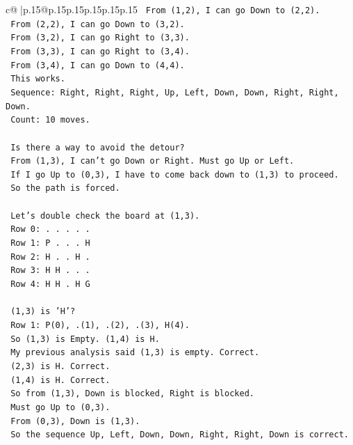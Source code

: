 \documentclass{article}
\begin{document}
{\begin{supertabular}{c@{$\;$}|p{.15\linewidth}@{}p{.15\linewidth}p{.15\linewidth}p{.15\linewidth}p{.15\linewidth}p{.15\linewidth}}
{{{\texttt{   From (1,2), I can go Down to (2,2).} \\
\texttt{   From (2,2), I can go Down to (3,2).} \\
\texttt{   From (3,2), I can go Right to (3,3).} \\
\texttt{   From (3,3), I can go Right to (3,4).} \\
\texttt{   From (3,4), I can go Down to (4,4).} \\
\texttt{   This works.} \\
\texttt{   Sequence: Right, Right, Right, Up, Left, Down, Down, Right, Right, Down.} \\
\texttt{   Count: 10 moves.} \\
\\ 
\texttt{   Is there a way to avoid the detour?} \\
\texttt{   From (1,3), I can't go Down or Right. Must go Up or Left.} \\
\texttt{   If I go Up to (0,3), I have to come back down to (1,3) to proceed.} \\
\texttt{   So the path is forced.} \\
\\ 
\texttt{   Let's double check the board at (1,3).} \\
\texttt{   Row 0: . . . . .} \\
\texttt{   Row 1: P . . . H} \\
\texttt{   Row 2: H . . H .} \\
\texttt{   Row 3: H H . . .} \\
\texttt{   Row 4: H H . H G} \\
\\ 
\texttt{   (1,3) is 'H'?} \\
\texttt{   Row 1: P(0), .(1), .(2), .(3), H(4).} \\
\texttt{   So (1,3) is Empty. (1,4) is H.} \\
\texttt{   My previous analysis said (1,3) is empty. Correct.} \\
\texttt{   (2,3) is H. Correct.} \\
\texttt{   (1,4) is H. Correct.} \\
\texttt{   So from (1,3), Down is blocked, Right is blocked.} \\
\texttt{   Must go Up to (0,3).} \\
\texttt{   From (0,3), Down is (1,3).} \\
\texttt{   So the sequence Up, Left, Down, Down, Right, Right, Down is correct.} \\
}}}
\end{supertabular}}
\end{document}
